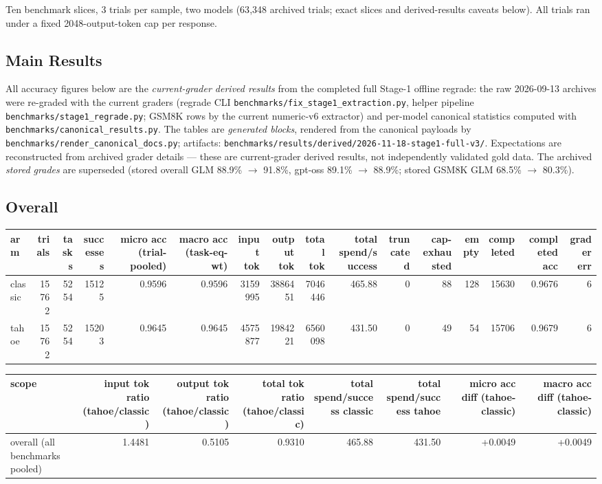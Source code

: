 \documentclass[11pt,a4paper]{article}
\begin{document}
Ten benchmark slices, 3 trials per sample, two models (63{,}348 archived
trials; exact slices and derived-results caveats below). All trials ran under a
fixed 2048-output-token cap per response.

\subsection{Main Results}

All accuracy figures below are the \emph{current-grader derived results}
from the completed full Stage-1 offline regrade: the raw 2026-09-13 archives
were re-graded with the current graders (regrade CLI
\texttt{benchmarks/fix\_stage1\_extraction.py}, helper pipeline
\texttt{benchmarks/stage1\_regrade.py}; GSM8K rows by the current
numeric-v6 extractor) and per-model canonical statistics
computed with \texttt{benchmarks/canonical\_results.py}. The tables are
\emph{generated blocks}, rendered from the canonical payloads by
\texttt{benchmarks/render\_canonical\_docs.py}; artifacts:
\texttt{benchmarks/results/derived/2026-11-18-stage1-full-v3/}. Expectations
are reconstructed from archived grader details --- these are current-grader
derived results, not independently validated gold data. The archived
\emph{stored grades} are superseded (stored overall GLM 88.9\% $\to$ 91.8\%,
gpt-oss 89.1\% $\to$ 88.9\%; stored GSM8K GLM 68.5\% $\to$ 80.3\%).

\begingroup\scriptsize\setlength{\tabcolsep}{3pt}
\subsection*{Overall}

\begin{tabular}{@{}l r r r r r r r r r r r r r r r@{}}
\toprule
arm & trials & tasks & successes & micro acc (trial-pooled) & macro acc (task-eq-wt) & input tok & output tok & total tok & total spend/success & truncated & cap-exhausted & empty & completed & completed acc & grader err \\
\midrule
classic & 15762 & 5254 & 15125 & 0.9596 & 0.9596 & 3159995 & 3886451 & 7046446 & 465.88 & 0 & 88 & 128 & 15630 & 0.9676 & 6 \\
tahoe & 15762 & 5254 & 15203 & 0.9645 & 0.9645 & 4575877 & 1984221 & 6560098 & 431.50 & 0 & 49 & 54 & 15706 & 0.9679 & 6 \\
\bottomrule
\end{tabular}

\begin{tabular}{@{}l r r r r r r r@{}}
\toprule
scope & input tok ratio (tahoe/classic) & output tok ratio (tahoe/classic) & total tok ratio (tahoe/classic) & total spend/success classic & total spend/success tahoe & micro acc diff (tahoe-classic) & macro acc diff (tahoe-classic) \\
\midrule
overall (all benchmarks pooled) & 1.4481 & 0.5105 & 0.9310 & 465.88 & 431.50 & +0.0049 & +0.0049 \\
\bottomrule
\end{tabular}
\end{document}
